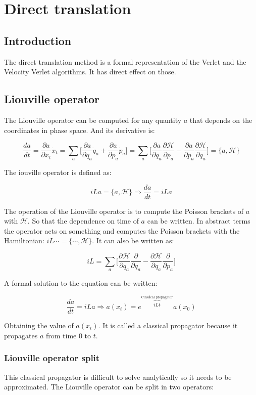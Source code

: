 \chapter{Direct translation}

\section{Introduction}
The direct translation method is a formal representation of the Verlet and the Velocity Verlet algorithms.
It has direct effect on those.

\section{Liouville operator}
The Liouville operator can be computed for any quantity $a$ that depends on the coordinates in phase space.
And its derivative is:

$$\frac{da}{dt} = \frac{\partial a}{\partial x_t}\dot{x}_t = \sum\limits_a\biggl[\frac{\partial a}{\partial q_a}\dot{q}_a + \frac{\partial a}{\partial p_a}\dot{p}_a\biggr] = \sum\limits_a\biggl[\frac{\partial a}{\partial q_a}\frac{\partial\mathcal{H}}{\partial p_a} - \frac{\partial a}{\partial p_a}\frac{\partial\mathcal{H}}{\partial q_a}\biggr] = \{a, \mathcal{H}\}$$

The iouville operator is defined as:

$$iLa = \{a, \mathcal{H}\}\Rightarrow\frac{da}{dt} = iLa$$

The operation of the Liouville operator is to compute the Poisson brackets of $a$ with $\mathcal{H}$.
So that the dependence on time of $a$ can be written.
In abstract terms the operator acts on something and computes the Poisson brackets with the Hamiltonian: $iL\cdots = \{\cdots, \mathcal{H}\}$.
It can also be written as:

$$iL = \sum\limits_a\biggl[\frac{\partial\mathcal{H}}{\partial q_a}\frac{\partial}{\partial q_a} - \frac{\partial\mathcal{H}}{\partial q_a}\frac{\partial}{\partial p_a}\biggr]$$

A formal solution to the equation can be written:

$$\frac{da}{dt} = iLa\Rightarrow a(x_t) = e^{\overbrace{iLt}^{\text{Classical propagator}}}a(x_0)$$

Obtaining the value of $a(x_t)$.
It is called a classical propagator because it propagates $a$ from time $0$ to $t$.

	\subsection{Liouville operator split}
	This classical propagator is difficult to solve analytically so it needs to be approximated.
	The Liouville operator can be split in two operators:

